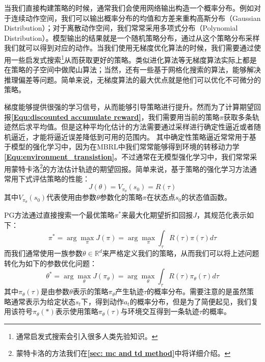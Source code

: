 当我们直接构建策略的时候，通常我们会使用网络输出构造一个概率分布。例如对于连续动作空间，我们可以输出概率分布的均值和方差来重构高斯分布（Gaussian Distribution）；对于离散动作空间，我们常常采用多项式分布（Polynomial Distribution）。模型输出的结果就是一个随机策略分布，通过从这个策略分布采样我们就可以得到对应的动作。当我们使用无梯度优化算法的时候，我们需要通过使用一些启发式搜索\footnote{通常启发式搜索会引入很多人类先验知识。}从而获取更好的策略。类似进化算法等无梯度算法实际上都是在策略的子空间中做爬山算法；当然，还有一些基于网格化搜索的算法，能够解决推理偏差等问题。简单来说，无梯度算法的最大优点就是他们可以优化不可微分的策略。

梯度能够提供很强的学习信号，从而能够引导策略进行提升。然而为了计算期望回报\textbf{\eqref{Equ:discounted accumulate reward}}，我们需要用当前的策略$\pi$获取多条轨迹然后求平均值。但是这种平均化估计的方法需要通过采样进行确定性逼近或者随机逼近，才能将逼近误差降低到可用的范围内。 其中确定性策略逼近常常用于基于模型的强化学习中，因为在MBRL中我们常常能够得到环境的转移动力学\textbf{\eqref{Equ:environment_transistion}}。不过通常在无模型强化学习中，我们常常采用蒙特卡洛\footnote{蒙特卡洛的方法我们在\textbf{\ref{sec: mc and td method}}中将详细介绍。}的方法估计轨迹的期望回报。简单来说，基于策略的强化学习方法通常用下式评估策略的性能：
\begin{equation}
    J(\theta)=V_{\pi_\theta}\left(s_{0}\right)=R(\tau)
\end{equation}
其中$V_{\pi_\theta}\left(s_{0}\right)$代表使用由参数$\theta$参数化的策略$\pi$在状态点$s_0$的状态值函数。

PG方法通过直接搜索一个最优策略$\pi^*$来最大化期望折扣回报$J$，其规范化表示如下：
\begin{equation}
    \pi^{*}=\arg \max _{\pi} J(\pi)=\arg \max _{\pi} \int_{\tau} R(\tau) \pi(\tau) d \tau
\end{equation}
而我们通常使用一族参数$\theta \in \mathbb{R}^{d}$来严格定义我们的策略，从而我们可以将上述问题转化为如下的参数优化问题：
\begin{equation}
    \theta^{*}=\arg \max _{\theta} J\left(\pi_{\theta}\right)=\arg \max _{\theta} \int_{\tau} R(\tau) \pi_{\theta}(\tau) d \tau
\end{equation}
其中$\pi_{\theta}(\tau)$是由参数$\theta$表示的策略$\pi_{\theta}$产生轨迹$\tau$的概率分布。需要注意的是虽然策略通常表示为给定状态$s_t$下，得到动作$a_t$的概率分布，但是为了简便起见，我们复用该符号$\pi_{\theta}(*)$表示使用策略$\pi_{\theta}(\tau)$与环境交互得到一条轨迹$\tau$的概率。

